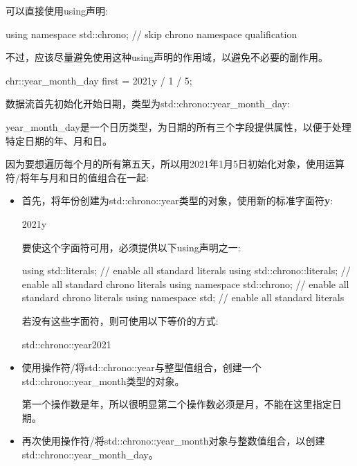 可以直接使用using声明:

\begin{cpp}
using namespace std::chrono; // skip chrono namespace qualification
\end{cpp}

不过，应该尽量避免使用这种using声明的作用域，以避免不必要的副作用。


\begin{cpp}
chr::year_month_day first = 2021y / 1 / 5;
\end{cpp}

数据流首先初始化开始日期，类型为std::chrono::year\_month\_day:

year\_month\_day是一个日历类型，为日期的所有三个字段提供属性，以便于处理特定日期的年、月和日。

因为要想遍历每个月的所有第五天，所以用2021年1月5日初始化对象，使用运算符/将年与月和日的值组合在一起:

\begin{itemize}
\item
首先，将年份创建为std::chrono::year类型的对象，使用新的标准字面符\textbf{y}:

\begin{cpp}
2021y
\end{cpp}

要使这个字面符可用，必须提供以下using声明之一:

\begin{cpp}
using std::literals; // enable all standard literals
using std::chrono::literals; // enable all standard chrono literals
using namespace std::chrono; // enable all standard chrono literals
using namespace std; // enable all standard literals
\end{cpp}

若没有这些字面符，则可使用以下等价的方式:

\begin{cpp}
std::chrono::year{2021}
\end{cpp}

\item
使用操作符/将std::chrono::year与整型值组合，创建一个std::chrono::year\_month类型的对象。

第一个操作数是年，所以很明显第二个操作数必须是月，不能在这里指定日期。

\item
再次使用操作符/将std::chrono::year\_month对象与整数值组合，以创建std::chrono::year\_month\_day。
\end{itemize}

